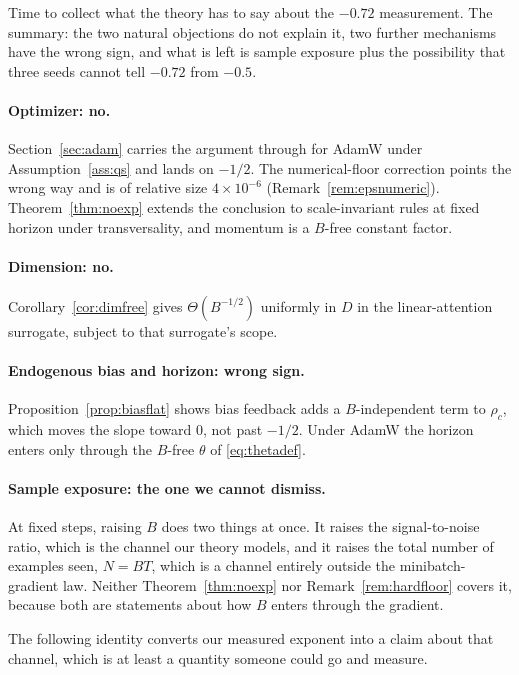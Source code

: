\documentclass{article}
\theoremstyle{plain}
\theoremstyle{definition}
\theoremstyle{remark}
\newcommand{\1}{\mathbf{1}}
\begin{document}
Time to collect what the theory has to say about the $-0.72$ measurement. The
summary: the two natural objections do not explain it, two further mechanisms
have the wrong sign, and what is left is sample exposure plus the possibility
that three seeds cannot tell $-0.72$ from $-0.5$.

\paragraph{Optimizer: no.}
Section~\ref{sec:adam} carries the argument through for AdamW under
Assumption~\ref{ass:qs} and lands on $-1/2$. The numerical-floor correction points
the wrong way and is of relative size $4\times10^{-6}$
(Remark~\ref{rem:epsnumeric}). Theorem~\ref{thm:noexp} extends the conclusion to
scale-invariant rules at fixed horizon under transversality, and momentum is a
$B$-free constant factor.

\paragraph{Dimension: no.}
Corollary~\ref{cor:dimfree} gives $\Theta(B^{-1/2})$ uniformly in $D$ in the
linear-attention surrogate, subject to that surrogate's scope.

\paragraph{Endogenous bias and horizon: wrong sign.}
Proposition~\ref{prop:biasflat} shows bias feedback adds a $B$-independent term
to $\rho_c$, which moves the slope toward $0$, not past $-1/2$. Under AdamW the
horizon enters only through the $B$-free $\theta$ of \eqref{eq:thetadef}.

\paragraph{Sample exposure: the one we cannot dismiss.}
At fixed steps, raising $B$ does two things at once. It raises the
signal-to-noise ratio, which is the channel our theory models, and it raises the
total number of examples seen, $N = BT$, which is a channel entirely outside the
minibatch-gradient law. Neither Theorem~\ref{thm:noexp} nor
Remark~\ref{rem:hardfloor} covers it, because both are statements about how $B$
enters through the gradient.

The following identity converts our measured exponent into a claim about that
channel, which is at least a quantity someone could go and measure.
\end{document}
